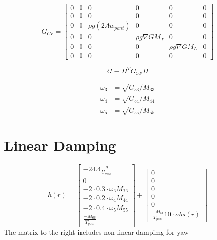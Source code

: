 \documentclass[12pt,a4]{article}
\begin{document}
\begin{equation}
	G_{CF} = \begin{bmatrix}
		0 & 0 & 0                       & 0                    & 0                   & 0 \\
		0 & 0 & 0                       & 0                    & 0                   & 0 \\
		0 & 0 & \rho  g  (2  Aw_{pont}) & 0                    & 0                   & 0 \\
		0 & 0 & 0                       & \rho  g \nabla  GM_T & 0                   & 0 \\
		0 & 0 & 0                       & 0                    & \rho  g \nabla GM_L & 0 \\
		0 & 0 & 0                       & 0                    & 0                   & 0
	\end{bmatrix}
\end{equation}




\begin{equation}
	G = H^T  G_{CF}  H
\end{equation}

\begin{align}
	\omega_3 & = \sqrt{G_{33}/M_{33}} \\
	\omega_4 & = \sqrt{G_{44}/M_{44}} \\
	\omega_5 & = \sqrt{G_{55}/M_{55}}
\end{align}

\section{Linear Damping}
\begin{equation}
	h(r) =
	\begin{bmatrix}
		-24.4 \frac{g}{U_{max}}             \\
		0                                   \\
		-2 \cdot 0.3 \cdot \omega_3  M_{33} \\
		-2 \cdot 0.2 \cdot \omega_4  M_{44} \\
		-2 \cdot 0.4 \cdot \omega_5  M_{55} \\
		\frac{-M_{66}}{T_{yaw}}
	\end{bmatrix} + \begin{bmatrix}0\\0\\0\\0\\0\\  \frac{-M_{66}}{T_{yaw}} 10 \cdot abs(r)\end{bmatrix}
\end{equation}
The matrix to the right includes non-linear dampimg for yaw
\end{document}

